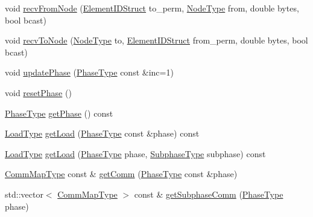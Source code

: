 \begin{DoxyCompactItemize}
\item 
void \hyperlink{structvt_1_1elm_1_1_element_l_b_data_aadd1fa3ab5c86886b970989d05286901}{recv\+From\+Node} (\hyperlink{structvt_1_1elm_1_1_element_i_d_struct}{Element\+I\+D\+Struct} to\+\_\+perm, \hyperlink{namespacevt_a866da9d0efc19c0a1ce79e9e492f47e2}{Node\+Type} from, double bytes, bool bcast)
\item 
void \hyperlink{structvt_1_1elm_1_1_element_l_b_data_ac9fefbad98060214e8720b46a5a8aaf6}{recv\+To\+Node} (\hyperlink{namespacevt_a866da9d0efc19c0a1ce79e9e492f47e2}{Node\+Type} to, \hyperlink{structvt_1_1elm_1_1_element_i_d_struct}{Element\+I\+D\+Struct} from\+\_\+perm, double bytes, bool bcast)
\item 
void \hyperlink{structvt_1_1elm_1_1_element_l_b_data_acb64ab9bcd98f12bd5cae08ebbefd943}{update\+Phase} (\hyperlink{namespacevt_a46ce6733d5cdbd735d561b7b4029f6d7}{Phase\+Type} const \&inc=1)
\item 
void \hyperlink{structvt_1_1elm_1_1_element_l_b_data_aa6547718a29385a1600e29ae4b0792dd}{reset\+Phase} ()
\item 
\hyperlink{namespacevt_a46ce6733d5cdbd735d561b7b4029f6d7}{Phase\+Type} \hyperlink{structvt_1_1elm_1_1_element_l_b_data_ab3e11f3720c9c8ce83b23610eccbef08}{get\+Phase} () const
\item 
\hyperlink{namespacevt_a8fb51741340b87d7aaee0bef60e9896b}{Load\+Type} \hyperlink{structvt_1_1elm_1_1_element_l_b_data_a839f0515eda6316ee2d6e64bb145e1f4}{get\+Load} (\hyperlink{namespacevt_a46ce6733d5cdbd735d561b7b4029f6d7}{Phase\+Type} const \&phase) const
\item 
\hyperlink{namespacevt_a8fb51741340b87d7aaee0bef60e9896b}{Load\+Type} \hyperlink{structvt_1_1elm_1_1_element_l_b_data_abbc3c3c8a7c969b0a291f25b8e0d0a62}{get\+Load} (\hyperlink{namespacevt_a46ce6733d5cdbd735d561b7b4029f6d7}{Phase\+Type} phase, \hyperlink{namespacevt_ae78cbfdf1e57470e33eedb074f2beeba}{Subphase\+Type} subphase) const
\item 
\hyperlink{namespacevt_1_1elm_a38487cb8896b9b4763efa9022fab560e}{Comm\+Map\+Type} const  \& \hyperlink{structvt_1_1elm_1_1_element_l_b_data_a9a59e8546283b731702d07f2360d527d}{get\+Comm} (\hyperlink{namespacevt_a46ce6733d5cdbd735d561b7b4029f6d7}{Phase\+Type} const \&phase)
\item 
std\+::vector$<$ \hyperlink{namespacevt_1_1elm_a38487cb8896b9b4763efa9022fab560e}{Comm\+Map\+Type} $>$ const  \& \hyperlink{structvt_1_1elm_1_1_element_l_b_data_a32d430c814238614d01cc4bc87c3b22b}{get\+Subphase\+Comm} (\hyperlink{namespacevt_a46ce6733d5cdbd735d561b7b4029f6d7}{Phase\+Type} phase)

\end{DoxyCompactItemize}
